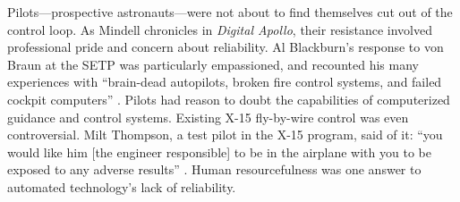Pilots---prospective astronauts---were not about to find themselves
cut out of the control loop. As Mindell chronicles in \emph{Digital
  Apollo}, their resistance involved professional pride and concern
about reliability. Al Blackburn's response to von Braun at the
SETP was particularly empassioned, and recounted his many experiences with
``brain-dead autopilots, broken fire control systems, and failed cockpit
computers'' \cite[p. 68]{DM}. Pilots had  
reason to doubt the capabilities of computerized guidance and
control systems. Existing X-15 fly-by-wire control \cite{hypersonics} was even
  controversial. Milt Thompson, a test pilot in the X-15 program, said
  of it: ``you would like him [the engineer responsible] to be in the
airplane with you to be exposed to any adverse results'' \cite[p.
  55]{DM}. Human resourcefulness was one answer to automated
technology's lack of reliability. 






